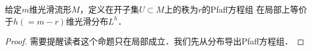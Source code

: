 \begin{proposition}\label{chdf:thm_dwwd}
    给定$m$维光滑流形$M$，定义在开子集$U\subset M$上的秩为$r$的Pfaff方程组
    在局部上{\kaishu 等价于}$h(=m-r)$维光滑分布$L^h$．
\end{proposition}
\begin{proof}
    需要提醒读者这个命题只在局部成立．我们先从分布导出Pfaff方程组．




\end{proof}
